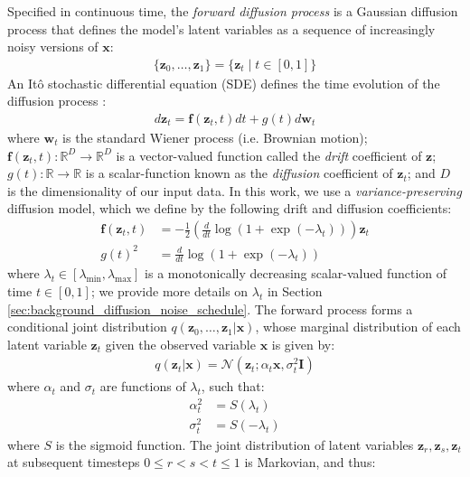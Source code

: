 \documentclass[ oneside,%
                    author={George Herbert},
                    degree={MSci},
                     title={Diffusion Models for Time-Evolving Precipitation Fields},
                  subtitle={}]{dissertation}
\begin{document}
Specified in continuous time, the \textit{forward diffusion process} is a Gaussian diffusion process that defines the model's latent variables as a sequence of increasingly noisy versions of $\mathbf{x}$:
\begin{align}
      \{\mathbf{z}_0,\ldots,\mathbf{z}_1\}=\{\mathbf{z}_t\mid t\in[0,1]\}
\end{align}
An It\^{o} stochastic differential equation (SDE) defines the time evolution of the diffusion process \cite{Score_Based_Song}:
\begin{align}
      d\mathbf{z}_t=\mathbf{f}(\mathbf{z}_t,t)dt + g(t)d\mathbf{w}_t\label{eq:forward_sde}
\end{align}
where $\mathbf{w}_t$ is the standard Wiener process (i.e. Brownian motion); $\mathbf{f}(\mathbf{z}_t, t):\mathbb{R}^D\to\mathbb{R}^D$ is a vector-valued function called the \textit{drift} coefficient of $\mathbf{z}$; $g(t):\mathbb{R}\to\mathbb{R}$ is a scalar-function known as the \textit{diffusion} coefficient of $\mathbf{z}_t$; and $D$ is the dimensionality of our input data. In this work, we use a \textit{variance-preserving} diffusion model, which we define by the following drift and diffusion coefficients:
\begin{align}
      \mathbf{f}(\mathbf{z}_t,t)&=-\frac{1}{2}\left(\frac{d}{dt}\log\left(1+\exp(-\lambda_t)\right)\right)\mathbf{z}_t\\
      g(t)^2&=\frac{d}{dt}\log\left(1+\exp(-\lambda_t)\right)\label{eq:diffusion_coefficient_scalar}
\end{align}
where $\lambda_t\in[\lambda_{\min}, \lambda_{\max}]$ is a monotonically decreasing scalar-valued function of time $t\in[0,1]$; we provide more details on $\lambda_t$ in Section \ref{sec:background_diffusion_noise_schedule}. The forward process forms a conditional joint distribution $q(\mathbf{z}_0,\ldots,\mathbf{z}_1|\mathbf{x})$, whose marginal distribution of each latent variable $\mathbf{z}_t$ given the observed variable $\mathbf{x}$ is given by:
\begin{align}
      q(\mathbf{z}_t|\mathbf{x})=\mathcal{N}\left(\mathbf{z}_t;\alpha_t\mathbf{x},\sigma_t^2\mathbf{I}\right)
      \label{eq:q_z_t_given_x}
\end{align}
where $\alpha_t$ and $\sigma_t$ are functions of $\lambda_t$, such that:
\begin{align}
      \alpha_t^2 &= S(\lambda_t)\\
      \sigma_t^2 &= S(-\lambda_t)
\end{align}
where $S$ is the sigmoid function. The joint distribution of latent variables $\mathbf{z}_r,\mathbf{z}_s,\mathbf{z}_t$ at subsequent timesteps $0\le r < s < t \le 1$ is Markovian, and thus:
\end{document}
